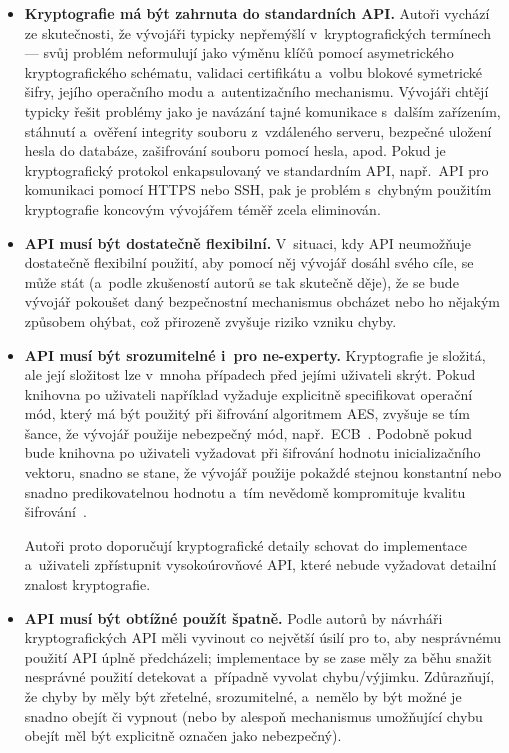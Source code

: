 \begin{itemize}
    \item \textbf{Kryptografie má být zahrnuta do standardních API.} \enskip
        Autoři vychází ze skutečnosti, že vývojáři typicky nepřemýšlí v~kryptografických termínech --- svůj problém neformulují jako výměnu klíčů pomocí asymetrického kryptografického schématu, validaci certifikátu a~volbu blokové symetrické šifry, jejího operačního modu a~autentizačního mechanismu. Vývojáři chtějí typicky řešit problémy jako je navázání tajné komunikace s~dalším zařízením, stáhnutí a~ověření integrity souboru z~vzdáleného serveru, bezpečné uložení hesla do databáze, zašifrování souboru pomocí hesla, apod. Pokud je kryptografický protokol enkapsulovaný ve standardním API, např.\ API pro komunikaci pomocí HTTPS nebo SSH, pak je problém s~chybným použitím kryptografie koncovým vývojářem téměř zcela eliminován.

    \item \textbf{API musí být dostatečně flexibilní.} \enskip
        V~situaci, kdy API neumožňuje dostatečně flexibilní použití, aby pomocí něj vývojář dosáhl svého cíle, se může stát (a~podle zkušeností autorů se tak skutečně děje), že se bude vývojář pokoušet daný bezpečnostní mechanismus obcházet nebo ho nějakým způsobem ohýbat, což přirozeně zvyšuje riziko vzniku chyby.

    \item \textbf{API musí být srozumitelné i~pro ne-experty.} \enskip
        Kryptografie je složitá, ale její složitost lze v~mnoha případech před jejími uživateli skrýt. Pokud knihovna po uživateli například vyžaduje explicitně specifikovat operační mód, který má být použitý při šifrování algoritmem AES, zvyšuje se tím šance, že vývojář použije nebezpečný mód, např.\ ECB~\cite{comparing2017}. Podobně pokud bude knihovna po uživateli vyžadovat při šifrování hodnotu inicializačního vektoru, snadno se stane, že vývojář použije pokaždé stejnou konstantní nebo snadno predikovatelnou hodnotu a~tím nevědomě kompromituje kvalitu šifrování~\cite{das2014iv}.

        Autoři proto doporučují kryptografické detaily schovat do implementace a~uživateli z\-pří\-stup\-nit vysokoúrovňové API, které nebude vyžadovat detailní znalost kryptografie.

    \item \textbf{API musí být obtížné použít špatně.} \enskip
        Podle autorů by návrháři kryptografických API měli vyvinout co největší úsilí pro to, aby nesprávnému použití API úplně předcházeli; implementace by se zase měly za běhu snažit nesprávné použití detekovat a~případně vyvolat chybu/výjimku. Zdůrazňují, že chyby by měly být zřetelné, srozumitelné, a~nemělo by být možné je snadno obejít či vypnout (nebo by alespoň mechanismus umožňující chybu obejít měl být explicitně označen jako nebezpečný).


\end{itemize}
